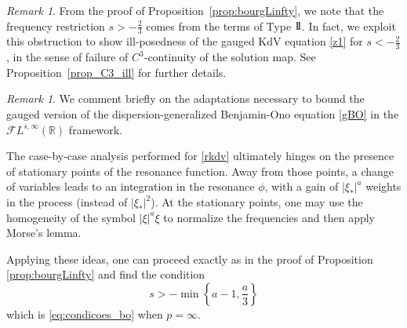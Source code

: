 \documentclass[%
11pt,  reqno]{amsart}
\makeatletter
\newcommand{\II}{\textup{I \hspace{-2.9mm} I} }
\newcommand{\IV}{\textup{I \hspace{-2.9mm} V}}
\newcommand{\5}{\textup{V}}
\newcommand{\VI}{\text{V\hspace{-1.6mm} I}}
\newcommand{\FL}{\mathcal{F} L}
\theoremstyle{remark}
\newtheorem{remark}[theorem]{Remark}
\newcommand{\R}{\mathbb{R}}
\def\<#1>{\csname MH@symb@#1\endcsname}
\numberwithin{equation}{section}
\numberwithin{theorem}{section}
\makeatother
\begin{document}
\begin{remark}
\rm 


From the proof of Proposition~\ref{prop:bourgLinfty}, we note that the frequency restriction $s> -\frac23$ comes from the terms of Type $\II$.
In fact, 
we exploit this obstruction to show ill-posedness of the gauged KdV equation \eqref{z1} 
for $s<-\frac23$, in the sense of failure of $C^3$-continuity of the solution map. See Proposition~\ref{prop_C3_ill} for further details. 
% 

\end{remark}


\begin{remark}\label{remark:bo1}
    We comment briefly on the adaptations necessary to bound the gauged version of the dispersion-generalized Benjamin-Ono equation \eqref{gBO} in the $\FL^{s,\infty}(\R)$ framework. 
    
    The case-by-case analysis performed for \eqref{rkdv} ultimately hinges on the presence of stationary points of the resonance function. Away from those points, a change of variables leads to an integration in the resonance $\phi$, with a gain of $|\xi_\ast|^a$ weights in the process (instead of $|\xi_\ast|^2$). At the stationary points, one may use the homogeneity of the symbol $|\xi|^a \xi$ to normalize the frequencies and then apply Morse's lemma.

    Applying these ideas, one can proceed exactly as in the proof of Proposition \ref{prop:bourgLinfty} and find the condition
    $$
    s>-\min\left\{a-1,\frac a 3\right\}
    $$
    which is \eqref{eq:condicoes_bo} when $p=\infty$.
\end{remark}



\end{document}
